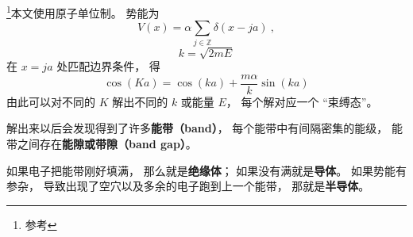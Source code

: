 
\begin{issues}
\issueDraft
\end{issues}


\footnote{参考\cite{GriffQ}}本文使用原子单位制。 势能为
\begin{equation}
V(x) = \alpha \sum_{j\in \mathbb Z} \delta(x - ja)~,
\end{equation}
\begin{equation}
k = \sqrt{2mE}
\end{equation}
在 $x = ja$ 处匹配边界条件， 得
\begin{equation}
\cos(K a) = \cos(ka) + \frac{m\alpha}{k}\sin(ka)
\end{equation}
由此可以对不同的 $K$ 解出不同的 $k$ 或能量 $E$， 每个解对应一个 “束缚态”。

解出来以后会发现得到了许多\textbf{能带（band）}， 每个能带中有间隔密集的能级， 能带之间存在\textbf{能隙或带隙（band gap）}。

如果电子把能带刚好填满， 那么就是\textbf{绝缘体}； 如果没有满就是\textbf{导体}。 如果势能有参杂， 导致出现了空穴以及多余的电子跑到上一个能带， 那就是\textbf{半导体}。

